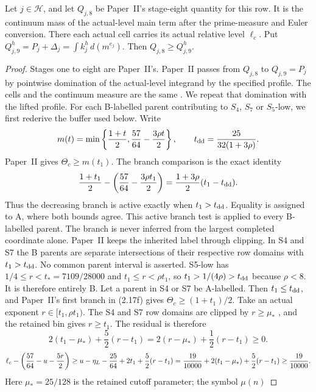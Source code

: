\begin{lemma}\label{lem:retB-lifted-direct}
Let $j\in\mathcal H$, and let $Q_{j,8}$ be Paper~II's stage-eight quantity
for this row. It is the continuum mass of the actual-level main term after the
prime-measure and Euler conversion. There each actual cell carries its
actual relative level $\ell_c$. Put $Q^h_{j,9}=P_j+\Delta_j=\int
k_j^h\,d(m^{e_j})$. Then $Q_{j,8}\ge Q^h_{j,9}$.
\end{lemma}

\begin{proof}
Stages one to eight are Paper~II's. Paper~II passes from $Q_{j,8}$ to
$Q_{j,9}=P_j$ by pointwise domination of the actual-level integrand by the
specified profile. The cells and the continuum measure are the same
\cite[\S6.1, stage table; \S2.4, after (2.31); \S2.5, after (2.40)]{PaperII}.
We repeat that domination with the lifted profile.
For each B-labelled parent contributing to $S_4$, $S_7$ or $S_5$-low,
we first rederive the buffer used below. Write
\[
 m(t)=\min\left\{\frac{1+t}{2},\frac{57}{64}-\frac{3\rho t}{2}\right\},
 \qquad t_{\rm dd}=\frac{25}{32(1+3\rho)}.
\]
Paper~II gives $\Theta_c\ge m(t_1)$. The branch comparison is the exact
identity
\[
 \frac{1+t_1}{2}
 -\left(\frac{57}{64}-\frac{3\rho t_1}{2}\right)
 =\frac{1+3\rho}{2}(t_1-t_{\rm dd}).
\]
Thus the decreasing branch is active exactly when $t_1>t_{\rm dd}$.
Equality is assigned to A, where both bounds agree. This active branch test
is applied to every B-labelled parent. The branch is never inferred from the
largest completed coordinate alone. Paper~II keeps the inherited label through
clipping. In S4 and S7 the B parents are separate intersections of their
respective row domains with $t_1>t_{\rm dd}$. No common parent interval is
asserted. S5-low has $1/4\le r<t_*=7109/28000$ and
$t_1\le r<\rho t_1$, so $t_1>1/(4\rho)>t_{\rm dd}$ because $\rho<8$.
It is therefore entirely B. Let a parent in S4 or S7 be A-labelled.
Then $t_1\le t_{\rm dd}$, and Paper~II's first branch in (2.17f)
\cite[(2.17f)]{PaperII} gives
$\Theta_c\ge(1+t_1)/2$. Take an actual exponent $r\in[t_1,\rho t_1)$.
The S4 and S7 row domains are clipped by $r\ge\mu_*$
\cite[\S2.1, fixed-cutoff rows]{PaperII}, and the retained bin gives
$r\ge t_1$.
The residual is therefore
\[
 2(t_1-\mu_*)+\frac52(r-t_1)
 =2(r-\mu_*)+\frac12(r-t_1)\ge0.
\]
\[
 \ell_c-\left({57\over64}-u-{5r\over2}\right)
 \ge u-\eta_L-{25\over64}+2t_1+{5\over2}(r-t_1)
 = {19\over10000}+2(t_1-\mu_*)+{5\over2}(r-t_1)
 \ge {19\over10000}.
\]
Here $\mu_*=25/128$ is the retained cutoff parameter; the symbol $\mu(n)$

\end{proof}
